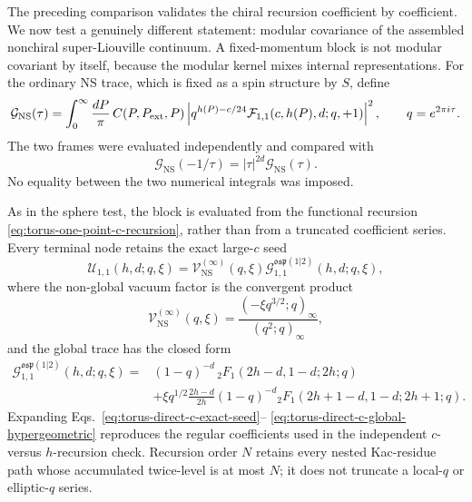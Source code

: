 \documentclass[11pt]{article}
\newcommand{\NS}{\mathrm{NS}}
\newcommand{\osp}{\mathfrak{osp}(1|2)}
\newcommand{\F}{\mathcal F}
\newcommand{\G}{\mathcal G}
\newcommand{\V}{\mathcal V}
\newcommand{\U}{\mathcal U}
\begin{document}
The preceding comparison validates the chiral recursion coefficient by
coefficient.  We now test a genuinely different statement: modular covariance
of the assembled nonchiral super-Liouville continuum.  A fixed-momentum block
is not modular covariant by itself, because the modular kernel mixes internal
representations.  For the ordinary NS trace, which is fixed as a spin structure
by \(S\), define
\begin{equation}
 \mathcal G_{\NS}(\tau)
 =\int_0^\infty\frac{dP}{\pi}\,
 C(P,P_{\rm ext},P)
 \left|q^{h(P)-c/24}\F_{1,1}(c,h(P),d;q,+1)\right|^2,
 \qquad q=e^{2\pi i\tau}.
 \label{eq:torus-direct-c-nonchiral-correlator}
\end{equation}
The two frames were evaluated independently and compared with
\begin{equation}
 \mathcal G_{\NS}(-1/\tau)=|\tau|^{2d}\mathcal G_{\NS}(\tau).
 \label{eq:torus-direct-c-modular-law}
\end{equation}
No equality between the two numerical integrals was imposed.

As in the sphere test, the block is evaluated from the functional recursion
\eqref{eq:torus-one-point-c-recursion}, rather than from a truncated
coefficient series.  Every terminal node retains the exact large-\(c\) seed
\begin{equation}
 \U_{1,1}(h,d;q,\xi)
 =\V_{\NS}^{(\infty)}(q,\xi)
  \G_{1,1}^{\osp}(h,d;q,\xi),
 \label{eq:torus-direct-c-exact-seed}
\end{equation}
where the non-global vacuum factor is the convergent product
\begin{equation}
 \V_{\NS}^{(\infty)}(q,\xi)
 =\frac{(-\xi q^{3/2};q)_\infty}{(q^2;q)_\infty},
 \label{eq:torus-direct-c-vacuum-product}
\end{equation}
and the global trace has the closed form
\begin{align}
 \G_{1,1}^{\osp}(h,d;q,\xi)
 ={}&(1-q)^{-d}\,{}_2F_1(2h-d,1-d;2h;q)
 \nonumber\\
 &+\xi q^{1/2}\frac{2h-d}{2h}(1-q)^{-d}
 {}_2F_1(2h+1-d,1-d;2h+1;q).
 \label{eq:torus-direct-c-global-hypergeometric}
\end{align}
Expanding Eqs.~\eqref{eq:torus-direct-c-exact-seed}--
\eqref{eq:torus-direct-c-global-hypergeometric} reproduces the regular
coefficients used in the independent \(c\)- versus \(h\)-recursion check.
Recursion order \(N\) retains every nested Kac-residue path whose accumulated
twice-level is at most \(N\); it does not truncate a local-\(q\) or
elliptic-\(q\) series.
\end{document}
